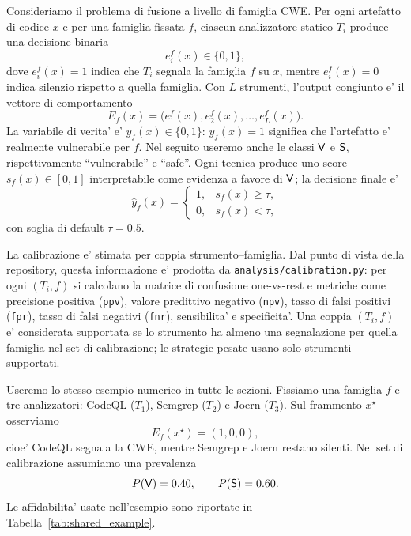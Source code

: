 Consideriamo il problema di fusione a livello di famiglia CWE. Per ogni artefatto di codice $x$ e per una famiglia fissata $f$, ciascun analizzatore statico $T_i$ produce una decisione binaria
\begin{equation}
e_i^f(x) \in \{0,1\},
\end{equation}
dove $e_i^f(x)=1$ indica che $T_i$ segnala la famiglia $f$ su $x$, mentre $e_i^f(x)=0$ indica silenzio rispetto a quella famiglia. Con $L$ strumenti, l'output congiunto e' il vettore di comportamento
\begin{equation}
E_f(x)=\bigl(e_1^f(x),e_2^f(x),\ldots,e_L^f(x)\bigr).
\end{equation}
La variabile di verita' e' $y_f(x)\in\{0,1\}$: $y_f(x)=1$ significa che l'artefatto e' realmente vulnerabile per $f$. Nel seguito useremo anche le classi $\mathsf{V}$ e $\mathsf{S}$, rispettivamente ``vulnerabile'' e ``safe''. Ogni tecnica produce uno score $s_f(x)\in[0,1]$ interpretabile come evidenza a favore di $\mathsf{V}$; la decisione finale e'
\begin{equation}
\hat{y}_f(x)=
\begin{cases}
1, & s_f(x)\geq \tau,\\
0, & s_f(x)<\tau,
\end{cases}
\end{equation}
con soglia di default $\tau=0.5$.

La calibrazione e' stimata per coppia strumento--famiglia. Dal punto di vista della repository, questa informazione e' prodotta da \texttt{analysis/calibration.py}: per ogni $(T_i,f)$ si calcolano la matrice di confusione one-vs-rest e metriche come precisione positiva (\texttt{ppv}), valore predittivo negativo (\texttt{npv}), tasso di falsi positivi (\texttt{fpr}), tasso di falsi negativi (\texttt{fnr}), sensibilita' e specificita'. Una coppia $(T_i,f)$ e' considerata supportata se lo strumento ha almeno una segnalazione per quella famiglia nel set di calibrazione; le strategie pesate usano solo strumenti supportati.

Useremo lo stesso esempio numerico in tutte le sezioni. Fissiamo una famiglia $f$ e tre analizzatori: CodeQL ($T_1$), Semgrep ($T_2$) e Joern ($T_3$). Sul frammento $x^\star$ osserviamo
\begin{equation}
E_f(x^\star)=(1,0,0),
\end{equation}
cioe' CodeQL segnala la CWE, mentre Semgrep e Joern restano silenti. Nel set di calibrazione assumiamo una prevalenza
\begin{equation}
P(\mathsf{V})=0.40,\qquad P(\mathsf{S})=0.60.
\end{equation}
Le affidabilita' usate nell'esempio sono riportate in Tabella~\ref{tab:shared_example}.

